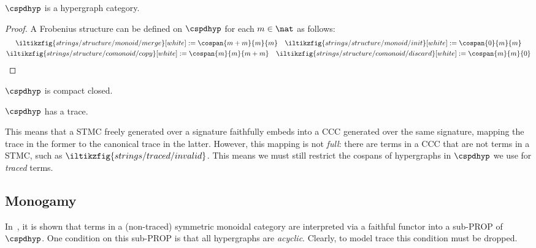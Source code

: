 \begin{proposition}\label{prop:frobenius-map}
    \(\cspdhyp\) is a hypergraph category.
\end{proposition}
\begin{proof}
    A Frobenius structure can be defined on \(\cspdhyp\) for each \(m \in \nat\)
    as follows:
    \begin{gather*}
        \iltikzfig{strings/structure/monoid/merge}[white]
        :=
        \cospan{m + m}{m}{m}
        \quad
        \iltikzfig{strings/structure/monoid/init}[white]
        :=
        \cospan{0}{m}{m}
        \\
        \iltikzfig{strings/structure/comonoid/copy}[white]
        :=
        \cospan{m}{m}{m+m}
        \quad
        \iltikzfig{strings/structure/comonoid/discard}[white]
        :=
        \cospan{m}{m}{0}
        \qedhere
    \end{gather*}
\end{proof}

\begin{corollary}
    \(\cspdhyp\) is compact closed.
\end{corollary}

\begin{corollary}
    \(\cspdhyp\) has a trace.
\end{corollary}

This means that a STMC freely generated over a signature faithfully embeds into
a CCC generated over the same signature, mapping the trace in the former to the
canonical trace in the latter.
However, this mapping is not \emph{full}: there are terms in a CCC that are not
terms in a STMC, such as \(\iltikzfig{strings/traced/invalid}\).
This means we must still restrict the cospans of hypergraphs in \(\cspdhyp\) we
use for \emph{traced} terms.

\subsection{Monogamy}

In~\cite{bonchi2016rewriting}, it is shown that terms in a (non-traced)
symmetric monoidal category are interpreted via a faithful functor into a
sub-PROP of \(\cspdhyp\).
One condition on this sub-PROP is that all hypergraphs are \emph{acyclic}.
Clearly, to model trace this condition must be dropped.

